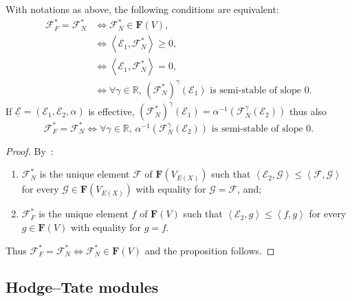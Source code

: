 \begin{prop}\label{prop:EquivCond4Fargues=00003DNewton}
With notations as above, the following conditions are equivalent:
\begin{align*}
\mathcal{F}_{F}^{\ast}=\mathcal{F}_{N}^{\ast} & \iff \mathcal{F}_{N}^{\ast}\in\mathbf{F}(V),\\
& \iff \left\langle \mathcal{E}_{1},\mathcal{F}_{N}^{\ast}\right\rangle \geq0,\\
& \iff \left\langle \mathcal{E}_{1},\mathcal{F}_{N}^{\ast}\right\rangle =0,\\
& \iff {\forall\gamma\in\mathbb{R}},\,(\mathcal{F}_{N}^{\ast})^{\gamma}(\mathcal{E}_{1})\text{ is semi-stable of slope }0.
\end{align*}
If $\underline{\mathcal{E}}=(\mathcal{E}_{1},\mathcal{E}_{2},\alpha)$ is effective, $(\mathcal{F}_{N}^{\ast})^{\gamma}(\mathcal{E}_{1})=\alpha^{-1}(\mathcal{F}_{N}^{\gamma}(\mathcal{E}_{2}))$ thus also
\[
\mathcal{F}_{F}^{\ast}=\mathcal{F}_{N}^{\ast}\iff{\forall\gamma\in\mathbb{R}},\,\alpha^{-1}(\mathcal{F}_{N}^{\gamma}(\mathcal{E}_{2}))\text{ is semi-stable of slope }0.
\]
\end{prop}

\begin{proof}
By~\cite[Proposition~6]{Co16}:
\begin{enumerate}
\item $\mathcal{F}_{N}^{\ast}$ is the unique element $\mathcal{F}$ of $\mathbf{F}(V_{E(X)})$ such that $\left\langle\mathcal{E}_{2},\mathcal{G}\right\rangle \leq\left\langle\mathcal{F},\mathcal{G}\right\rangle $ for every $\mathcal{G}\in\mathbf{F}(V_{E(X)})$ with equality for $\mathcal{G}=\mathcal{F}$, and;
\item $\mathcal{F}_{F}^{\ast}$ is the unique element $f$ of $\mathbf{F}(V)$ such that $\left\langle\mathcal{E}_{2},g\right\rangle \leq\left\langle f,g\right\rangle $ for every $g\in\mathbf{F}(V)$ with equality for $g=f$.
\end{enumerate}
Thus $\mathcal{F}_{F}^{\ast}=\mathcal{F}_{N}^{\ast}\Leftrightarrow\mathcal{F}_{N}^{\ast}\in\mathbf{F}(V)$ and the proposition follows.
\end{proof}

\subsection{Hodge--Tate modules}\label{subsec:HodgeTateModDef}

\subsubsection{}

